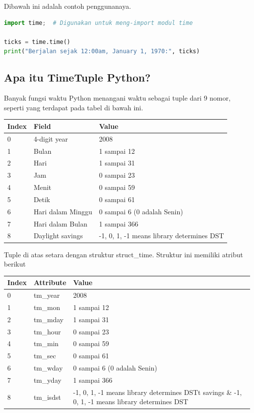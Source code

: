 Dibawah ini adalah contoh penggunanaya.
\begin{lstlisting}[language=Python]
import time;  # Digunakan untuk meng-import modul time

ticks = time.time()
print("Berjalan sejak 12:00am, January 1, 1970:", ticks)
\end{lstlisting}

\subsection{Apa itu TimeTuple Python?}
Banyak fungsi waktu Python menangani waktu sebagai tuple dari 9 nomor, seperti yang terdapat pada tabel di bawah ini.
\begin{center}
\begin{tabular}{ | m{3cm} | m{3cm} | m{5cm} | }
\hline
Index & Field & Value \\
\hline
0 & 4-digit year & 2008 \\
\hline
1 & Bulan & 1 sampai 12 \\
\hline
2 & Hari & 1 sampai 31 \\
\hline
3 & Jam & 0 sampai 23 \\
\hline
4 & Menit & 0 sampai 59 \\
\hline
5 & Detik & 0 sampai 61 \\
\hline
6 & Hari dalam Minggu & 0 sampai 6 (0 adalah Senin) \\
\hline
7 & Hari dalam Bulan & 1 sampai 366 \\
\hline
8 & Daylight savings & -1, 0, 1, -1 means library determines DST \\
\hline
\end{tabular}
\end{center}

Tuple di atas setara dengan struktur struct\_time. Struktur ini memiliki atribut berikut
\begin{center}
\begin{tabular}{ | m{3cm} | m{3cm} | m{5cm} | }
\hline
Index & Attribute & Value \\
\hline
0 & tm\_year & 2008 \\
\hline
1 & tm\_mon & 1 sampai 12 \\
\hline
2 & tm\_mday & 1 sampai 31 \\
\hline
3 & tm\_hour & 0 sampai 23 \\
\hline
4 & tm\_min & 0 sampai 59 \\
\hline
5 & tm\_sec & 0 sampai 61 \\
\hline
6 & tm\_wday & 0 sampai 6 (0 adalah Senin) \\
\hline
7 & tm\_yday & 1 sampai 366 \\
\hline
8 & tm\_isdst & -1, 0, 1, -1 means library determines DSTt savings \& -1, 0, 1, -1 means library determines DST \\
\hline
\end{tabular}
\end{center}

